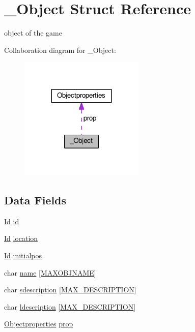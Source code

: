 \hypertarget{struct__Object}{}\section{\+\_\+\+Object Struct Reference}
\label{struct__Object}


object of the game  




Collaboration diagram for \+\_\+\+Object\+:
\nopagebreak
\begin{figure}[H]
\begin{center}
\leavevmode
\includegraphics[width=168pt]{struct__Object__coll__graph}
\end{center}
\end{figure}
\subsection*{Data Fields}
\begin{DoxyCompactItemize}
\item 
\hyperlink{types_8h_a845e604fb28f7e3d97549da3448149d3}{Id} \hyperlink{struct__Object_a3cff7a0e8dc4e9d23895ed9af1b7653a}{id}
\item 
\hyperlink{types_8h_a845e604fb28f7e3d97549da3448149d3}{Id} \hyperlink{struct__Object_a3c596b8898734de2f71fd1a33dfa72fb}{location}
\item 
\hyperlink{types_8h_a845e604fb28f7e3d97549da3448149d3}{Id} \hyperlink{struct__Object_a14c4dfa849520565b86f235c87827546}{initialpos}
\item 
char \hyperlink{struct__Object_ada77f97bbe2b9be36715adba222eebc6}{name} \mbox{[}\hyperlink{object_8h_a88b1ded1b83576bfb0683aeab25ae052}{M\+A\+X\+O\+B\+J\+N\+A\+ME}\mbox{]}
\item 
char \hyperlink{struct__Object_ae9fbe2f03c6902aa879c5ff437fa2444}{sdescription} \mbox{[}\hyperlink{types_8h_a2b9d4cb1200ff8c085b0a4902e0d7229}{M\+A\+X\+\_\+\+D\+E\+S\+C\+R\+I\+P\+T\+I\+ON}\mbox{]}
\item 
char \hyperlink{struct__Object_ace9493f4f8d73f26e2cc79bb65bf6309}{ldescription} \mbox{[}\hyperlink{types_8h_a2b9d4cb1200ff8c085b0a4902e0d7229}{M\+A\+X\+\_\+\+D\+E\+S\+C\+R\+I\+P\+T\+I\+ON}\mbox{]}
\item 
\hyperlink{structObjectproperties}{Objectproperties} \hyperlink{struct__Object_a2acdcc90e7417c2ab1bc41e52a107c2d}{prop}
\end{DoxyCompactItemize}


